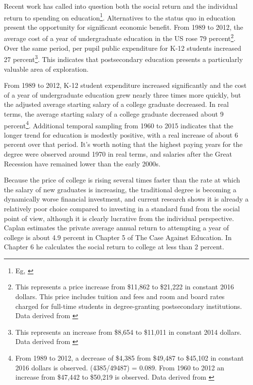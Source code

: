 \documentclass[AER]{/Users/zyl357/Documents/GitHub/research-dissertation-case-for-alt-ed/papers/alt-ed-survey/aea-latex-templates/AEA}
\begin{document}
Recent work has called into question both the social return and the
individual return to spending on education\footnote{Eg, \cite{caplan2018case}}. Alternatives to the status quo
in education present the opportunity for significant economic benefit.
From 1989 to 2012, the average cost of a year of undergraduate education
in the US rose 79 percent\footnote{This represents a price increase from \$11,862 to \$21,222 in constant 2016
dollars. This price includes tuition and fees and room and board rates charged for full-time students in
degree-granting postsecondary institutions. Data derived from \cite{nces2017averageundergraduatetuition}}.
Over the same period, per pupil public expenditure for
K-12 students increased 27 percent\footnote{This represents an increase from \$8,654 to \$11,011 in constant
2014 dollars. Data derived from \cite{nces2015expendituresperpupil}}. This indicates that
postsecondary education presents a particularly valuable area of exploration.

From 1989 to 2012, K-12 student expenditure increased significantly and
the cost of a year of undergraduate education grew nearly three times more
quickly, but the adjusted average starting salary of a college graduate
decreased. In real terms, the average starting salary of a college
graduate decreased about 9 percent\footnote{From 1989 to 2012, a decrease of \$4,385 from \$49,487 to
\$45,102 in constant 2016 dollars is observed. (4385/49487) = 0.089. From 1960 to 2012 an increase from
\$47,442 to \$50,219 is observed. Data derived from \cite{koncz2016}}.
Additional temporal sampling from 1960 to
2015 indicates that the longer trend for education is modestly positive,
with a real increase of about 6 percent over that period. It’s worth noting that
the highest paying years for the degree were observed around 1970 in real
terms, and salaries after the Great Recession have remained lower than the
early 2000s.

Because the price of college is rising several times faster than the rate
at which the salary of new graduates is increasing, the traditional degree
is becoming a dynamically worse financial investment, and current research
shows it is already a relatively poor choice compared to investing in a
standard fund from the social point of view, although it is clearly
lucrative from the individual perspective. Caplan estimates the private
average annual return to attempting a year of college is about 4.9 percent in
Chapter 5 of The Case Against Education. In Chapter 6 he calculates the
social return to college at less than 2 percent.
\end{document}
